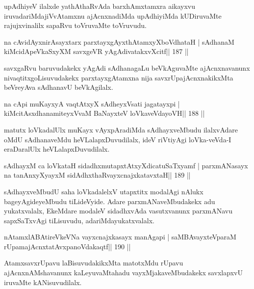 \begin{artha}
upAdhiyeV ilalxde yathAthaRvAda barxhAmxtamxra aikayxvu iruvadariMda\break jiVvAtamxnu ajAcnxnadiMda upAdhiyiMda kUDiruvaMte rajujxvinalilx sapaRvu toVruvaMte toVruvudu.
\end{artha}

\begin{shl}
na cAvidAyxnirAsayxtarx parxtayxgAyxthAtamxyXboVdhataH |
sAdhanaM kiMcidApeVkaSxyXM savxgeVR yAgAdivatakxvXcitf\hfill || 187 ||
\end{shl}

\begin{artha}
savxgaRvu baruvudakekx yAgAdi sAdhanagaLu beVkAguvaMte ajAcnxnavanunx nivaqtitxgoLisuvudakekx parxtayxgAtamxna nija savxrUpajAcnxnakikxMta beVreyAva sAdhanavU beVkAgilalx.
\end{artha}

\begin{shl}
na cApi muKayxyA vaqtAtxyX sAdheyxV\s sati jagatayxpi |
kiMcitAsxdhanamiteyxVvaM BaNayxteV loVkaveVdayoVH\hfill || 188 ||
\end{shl}

\begin{artha}
matutx loVkadalUlx muKayx vAyxpAradiMda sAdhayxveMbudu ilalxvAdare oMdU sAdhanaveMdu heVLalapxDuvudilalx, ideV riVtiyAgi loVka-veVda-I eraDaralUlx heVLalapxDuvudilalx.
\end{artha}

\begin{shl}
sAdhayxM ca loVkataH sidadhxmutapxtAtxyXdicatuSaTxyamf |
parxmANasayx na tanAnxyXyayxM sidAdhxthaRvayxcnajxkatavxtaH\hfill || 189 ||
\end{shl}

\begin{artha}
sAdhayxveMbudU saha loVkadalelxV utapxtitx modalAgi nAlukx bageyAgideyeMbudu tiLideVyide. Adare parxmANaveMbudakekx adu yukatxvalalx, EkeMdare modaleV sidadhxvAda vasutxvanunx parxmANavu sapxSaTxvAgi tiLisuvudu, adariMda\break yukatxvalalx.
\end{artha}


\begin{shl}
nA\s\s tamxlABAtireVkeVNa vayxcnajxkasayx manAgapi |
saMBAvayxteV\s paraM rUpamajAcnxtatAvxpanoVdakaqtf\hfill || 190 ||
\end{shl}

\begin{artha}
AtamxsavxrUpavu laBisuvudakikxMta matotxMdu rUpavu ajAcnxnAMshavanunx kaLeyuvaMtahadu vayxMjakaveMbudakekx savxlapxvU iruvaMte kANisuvudilalx.
\end{artha}

